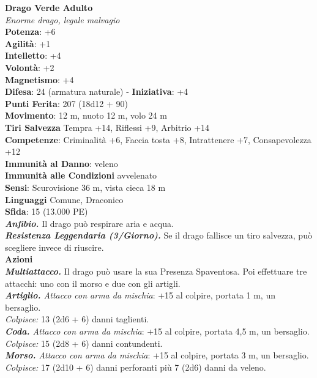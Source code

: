 \begin{multicols}{2}
\medskip\textbf{Drago Verde Adulto}\\
\emph{Enorme drago, legale malvagio}\\
\textbf{Potenza}: +6\\
\textbf{Agilità}: +1\\
\textbf{Intelletto}: +4\\
\textbf{Volontà}: +2\\
\textbf{Magnetismo}: +4\\
\textbf{Difesa}: 24 (armatura naturale) - \textbf{Iniziativa}: +4\\
\textbf{Punti Ferita}: 207 (18d12 + 90)\\
\textbf{Movimento}: 12 m, nuoto 12 m, volo 24 m\\
\textbf{Tiri Salvezza} Tempra +14, Riflessi +9, Arbitrio +14\\
\textbf{Competenze}: Criminalità +6, Faccia tosta +8, Intrattenere +7, Consapevolezza +12\\
\textbf{Immunità al Danno}: veleno\\
\textbf{Immunità alle Condizioni} avvelenato\\
\textbf{Sensi}: Scurovisione 36 m, vista cieca 18 m\\
\textbf{Linguaggi} Comune, Draconico\\
\textbf{Sfida}: 15 (13.000 PE)\smallskip\\
\emph{\textbf{Anfibio.}} Il drago può respirare aria e acqua.\\
\emph{\textbf{Resistenza Leggendaria (3/Giorno).}} Se il drago fallisce un tiro salvezza, può scegliere invece di riuscire.\\
\smallskip\textbf{Azioni}\\
\emph{\textbf{Multiattacco.}} Il drago può usare la sua Presenza Spaventosa. Poi effettuare tre attacchi: uno con il morso e due con gli artigli.\\
\emph{\textbf{Artiglio.} Attacco con arma da mischia}: +15 al colpire, portata 1 m, un bersaglio.\\
\emph{Colpisce:} 13 (2d6 + 6) danni taglienti.\\
\emph{\textbf{Coda.} Attacco con arma da mischia}: +15 al colpire, portata 4,5 m, un bersaglio.\\
\emph{Colpisce:} 15 (2d8 + 6) danni contundenti. \\
\emph{\textbf{Morso.} Attacco con arma da mischia}: +15 al colpire, portata 3 m, un bersaglio.\\
\emph{Colpisce:} 17 (2d10 + 6) danni perforanti più 7 (2d6) danni da veleno.\\

\end{multicols}
